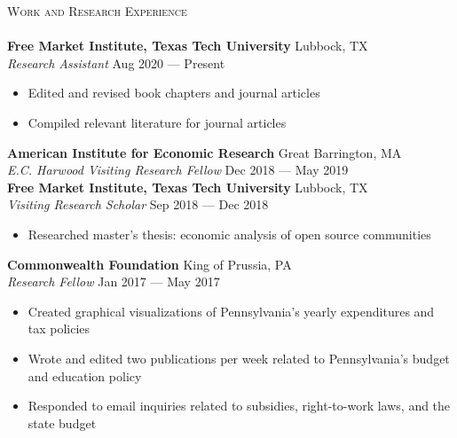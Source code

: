 \documentclass[a4paper,11pt]{article}
\newcommand{\lineunder} {
    \vspace*{-8pt} \\
    \hspace*{-18pt} \hrulefill \\
}
\newcommand{\header} [1] {
    {\hspace*{-18pt}\vspace*{6pt} \textsc{\large{#1}}}
    \vspace*{-6pt} \lineunder
}
\begin{document}
\vspace{1mm}
\header{Work and Research Experience}
\textbf{Free Market Institute, Texas Tech University} \hfill Lubbock, TX\\
\textit{Research Assistant} \hfill Aug 2020 --- Present \\
\begin{itemize}[noitemsep,nolistsep]
    \item Edited and revised book chapters and journal articles
    \item Compiled relevant literature for journal articles
\end{itemize}

\textbf{American Institute for Economic Research} \hfill Great Barrington, MA\\
\textit{E.C. Harwood Visiting Research Fellow} \hfill Dec 2018 --- May 2019\\

\textbf{Free Market Institute, Texas Tech University} \hfill Lubbock, TX\\
\textit{Visiting Research Scholar} \hfill Sep 2018 --- Dec 2018\\
\begin{itemize}[noitemsep, nolistsep]
    \item Researched master's thesis: economic analysis of open source communities
\end{itemize}

\textbf{Commonwealth Foundation} \hfill King of Prussia, PA\\
\textit{Research Fellow} \hfill Jan 2017 --- May 2017\\
\begin{itemize}[noitemsep,nolistsep]
    \item Created graphical visualizations of Pennsylvania's yearly expenditures and tax policies
    \item Wrote and edited two publications per week related to Pennsylvania's budget and education policy
    \item Responded to email inquiries related to subsidies, right-to-work laws, and the state budget
\end{itemize}
\end{document}
